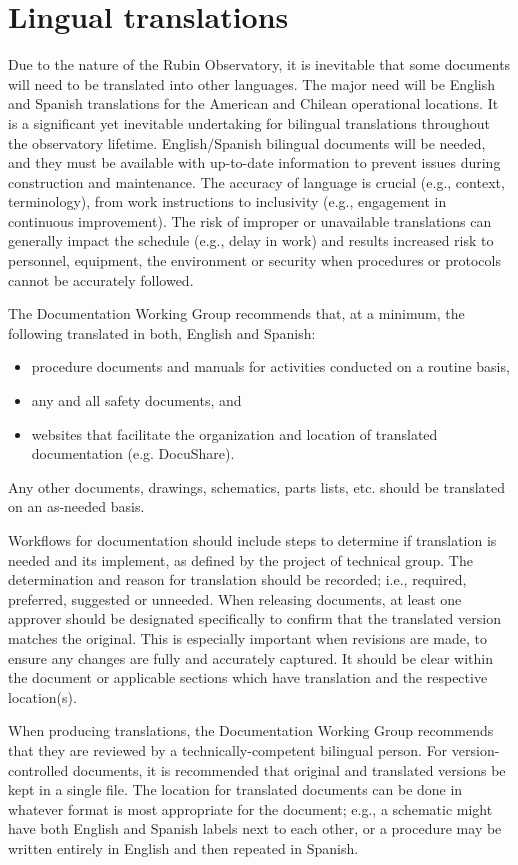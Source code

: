 \section{Lingual translations}

Due to the nature of the Rubin Observatory, it is inevitable that some documents will need to be translated into other languages.
The major need will be English and Spanish translations for the American and Chilean operational locations.
It is a significant yet inevitable undertaking for bilingual translations throughout the observatory lifetime.
English/Spanish bilingual documents will be needed, and they must be available with up-to-date information to prevent issues during construction and maintenance.
The accuracy of language is crucial (e.g., context, terminology), from work instructions to inclusivity (e.g., engagement in continuous improvement).
The risk of improper or unavailable translations can generally impact the schedule (e.g., delay in work) and results increased risk to personnel, equipment, the environment or security when procedures or protocols cannot be accurately followed.

The Documentation Working Group recommends that, at a minimum, the following translated in both, English and Spanish:
\begin{itemize}
	\item procedure documents and manuals for activities conducted on a routine basis,
	\item any and all safety documents, and
	\item websites that facilitate the organization and location of translated documentation (e.g. DocuShare).
\end{itemize}
Any other documents, drawings, schematics, parts lists, etc. should be translated on an as-needed basis.

Workflows for documentation should include steps to determine if translation is needed and its implement, as defined by the project of technical group.
The determination and reason for translation should be recorded; i.e., required, preferred, suggested or unneeded.
When releasing documents, at least one approver should be designated specifically to confirm that the translated version matches the original.
This is especially important when revisions are made, to ensure any changes are fully and accurately captured.
It should be clear within the document or applicable sections which have translation and the respective location(s).

When producing translations, the Documentation Working Group recommends that they are reviewed by a technically-competent bilingual person.
For version-controlled documents, it is recommended that original and translated versions be kept in a single file.
The location for translated documents can be done in whatever format is most appropriate for the document; e.g., a schematic might have both English and Spanish labels next to each other, or a procedure may be written entirely in English and then repeated in Spanish.

